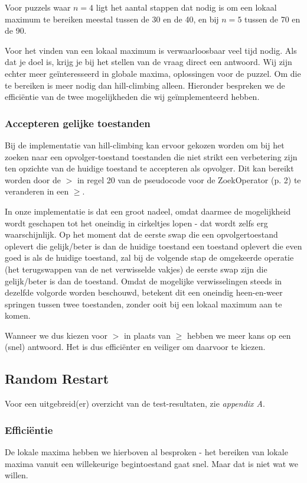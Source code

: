 \documentclass[]{report}
\begin{document}
Voor puzzels waar $n=4$ ligt het aantal stappen dat nodig is om een lokaal maximum te bereiken meestal tussen de 30 en de 40, en bij $n=5$ tussen de 70 en de 90.

Voor het vinden van een lokaal maximum is verwaarloosbaar veel tijd nodig. Als dat je doel is, krijg je bij het stellen van de vraag direct een antwoord. Wij zijn echter meer geïnteresseerd in globale maxima, oplossingen voor de puzzel. Om die te bereiken is meer nodig dan hill-climbing alleen. Hieronder bespreken we de effici\"{e}ntie van de twee mogelijkheden die wij ge\"{i}mplementeerd hebben.

\subsubsection{Accepteren gelijke toestanden}
Bij de implementatie van hill-climbing kan ervoor gekozen worden om bij het zoeken naar een opvolger-toestand toestanden die niet strikt een verbetering zijn ten opzichte van de huidige toestand te accepteren als opvolger. Dit kan bereikt worden door de $>$ in regel 20 van de pseudocode voor de ZoekOperator (p. 2) te veranderen in een $\geq$.

In onze implementatie is dat een groot nadeel, omdat daarmee de mogelijkheid wordt geschapen tot het oneindig in cirkeltjes lopen - dat wordt zelfs erg waarschijnlijk. Op het moment dat de eerste swap die een opvolgertoestand oplevert die gelijk/beter is dan de huidige toestand een toestand oplevert die even goed is als de huidige toestand, zal bij de volgende stap de omgekeerde operatie (het terugswappen van de net verwisselde vakjes) de eerste swap zijn die gelijk/beter is dan de toestand. Omdat de mogelijke verwisselingen steeds in dezelfde volgorde worden beschouwd, betekent dit een oneindig heen-en-weer springen tussen twee toestanden, zonder ooit bij een lokaal maximum aan te komen.

Wanneer we dus kiezen voor $>$ in plaats van $\geq$ hebben we meer kans op een (snel) antwoord. Het is dus effici\"{e}nter en veiliger om daarvoor te kiezen.

\subsection{Random Restart}
Voor een uitgebreid(er) overzicht van de test-resultaten, zie \textit{appendix A}.
\subsubsection{Effici\"{e}ntie}
De lokale maxima hebben we hierboven al besproken - het bereiken van lokale maxima vanuit een willekeurige begintoestand gaat snel. Maar dat is niet wat we willen.
\end{document}

